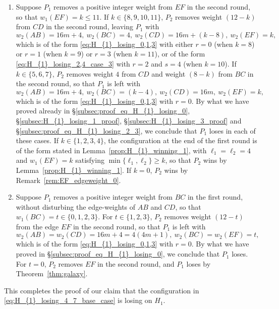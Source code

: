 \documentclass[11pt,reqno]{amsart}
\theoremstyle{definition}
\theoremstyle{definition}
\begin{document}
\begin{enumerate}
\item Suppose $P_{1}$ removes a positive integer weight from $EF$ in the second round, so that $w_{1}(EF)=k\leqslant 11$. If $k \in \{8,9,10,11\}$, $P_{2}$ removes weight $(12-k)$ from $CD$ in the second round, leaving $P_{1}$ with
\begin{equation}
w_{2}(AB)=16m+4,\ w_{2}(BC)=4,\ w_{2}(CD)=16m+(k-8),\ w_{2}(EF)=k,\nonumber
\end{equation}
which is of the form \eqref{eq:H_{1}_losing_0,1,3} with either $r=0$ (when $k=8$) or $r=1$ (when $k=9$) or $r=3$ (when $k=11$), or of the form \eqref{eq:H_{1}_losing_2,4_case_3} with $r=2$ and $s=4$ (when $k=10$). If $k \in \{5,6,7\}$, $P_{2}$ removes weight $4$ from $CD$ and weight $(8-k)$ from $BC$ in the second round, so that $P_{1}$ is left with
\begin{equation}
w_{2}(AB)=16m+4,\ w_{2}(BC)=(k-4),\ w_{2}(CD)=16m,\ w_{2}(EF)=k,\nonumber
\end{equation}
which is of the form \eqref{eq:H_{1}_losing_0,1,3} with $r=0$. By what we have proved already in \S\ref{subsec:proof_eq_H_{1}_losing_0}, \S\ref{subsec:H_{1}_losing_1_proof}, \S\ref{subsec:H_{1}_losing_3_proof} and \S\ref{subsec:proof_eq_H_{1}_losing_2_3}, we conclude that $P_{1}$ loses in each of these cases. If $k \in \{1,2,3,4\}$, the configuration at the end of the first round is of the form stated in Lemma~\ref{prop:H_{1}_winning_1}, with $\ell_{1}=\ell_{2}=4$ and $w_{1}(EF)=k$ satisfying $\min\{\ell_{1},\ell_{2}\}\geqslant k$, so that $P_{2}$ wins by Lemma~\ref{prop:H_{1}_winning_1}. If $k=0$, $P_{2}$ wins by Remark~\ref{rem:EF_edgeweight_0}.

\item Suppose $P_{1}$ removes a positive integer weight from $BC$ in the first round, without disturbing the edge-weights of $AB$ and $CD$, so that $w_{1}(BC)=t\in\{0,1,2,3\}$. For $t\in\{1,2,3\}$, $P_{2}$ removes weight $(12-t)$ from the edge $EF$ in the second round, so that $P_{1}$ is left with
\begin{equation}
w_{2}(AB)=w_{2}(CD)=16m+4=4(4m+1),\ w_{2}(BC)=w_{2}(EF)=t,\nonumber
\end{equation}
which is of the form \eqref{eq:H_{1}_losing_0,1,3} with $r=0$. By what we have proved in \S\ref{subsec:proof_eq_H_{1}_losing_0}, we conclude that $P_{1}$ loses. For $t=0$, $P_{2}$ removes $EF$ in the second round, and $P_{1}$ loses by Theorem~\ref{thm:galaxy}.
\end{enumerate}

This completes the proof of our claim that the configuration in \eqref{eq:H_{1}_losing_4_7_base_case} is losing on $H_{1}$. 
\end{document}
